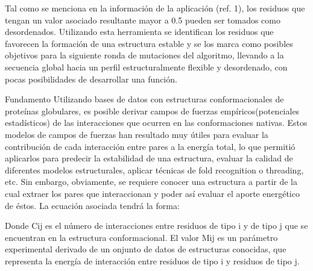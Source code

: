 Tal como se menciona en la información de la aplicación (ref. 1), los residuos que tengan un valor asociado resultante mayor a 0.5 pueden ser tomados como desordenados.
Utilizando esta herramienta se identifican los residuos que favorecen la formación de una estructura estable 
y se los marca como posibles objetivos para la siguiente ronda de mutaciones del algoritmo, llevando a la secuencia 
global hacia un perfil estructuralmente flexible y desordenado, con pocas posibilidades de desarrollar una función.


Fundamento
Utilizando bases de datos con estructuras conformacionales de proteínas globulares, 
es posible derivar campos de fuerzas empíricos(potenciales estadísticos) de las interacciones que ocurren en las conformaciones nativas. 
Estos modelos de campos de fuerzas han resultado muy útiles para evaluar la contribución de cada interacción entre pares a la energía total,
lo que permitió aplicarlos para predecir la estabilidad de una estructura, evaluar la calidad de diferentes modelos estructurales, aplicar técnicas de fold recognition o threading, etc. 
Sin embargo, obviamente, se requiere conocer una estructura a partir de la cual extraer los pares que interaccionan y poder así evaluar el aporte energético de éstos. 
La ecuación asociada tendrá la forma:





Donde Cij es el número de interacciones entre residuos de tipo i y de tipo j que se encuentran en la estructura conformacional. 
El valor Mij es un parámetro experimental derivado de un onjunto de datos de estructuras conocidas, que representa la energía de interacción entre residuos de tipo i y residuos de tipo j.

